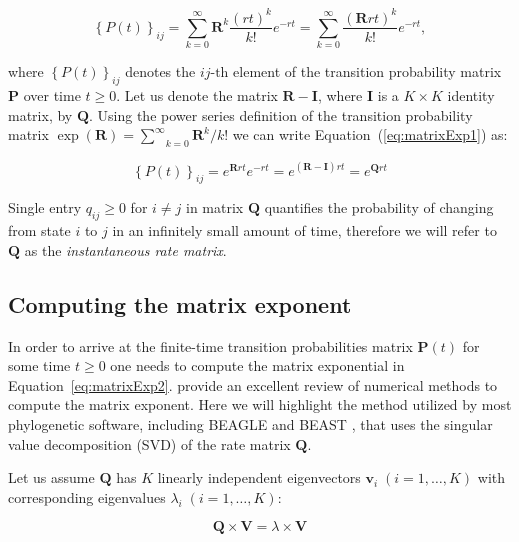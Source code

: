\begin{equation}
\left\{ P(t)\right\} _{ij}=\underset{k=0}{\overset{\infty}{\sum}}\mathbf{R}^{k}\frac{(r t)^{k}}{k!}e^{-r t}=\underset{k=0}{\overset{\infty}{\sum}}\frac{(\mathbf{R}r t)^{k}}{k!}e^{-r t},
\label{eq:matrixExp1}
\end{equation}

\noindent
where $\left\{ P(t)\right\} _{ij}$ denotes the $ij\text{-th}$ element of the transition probability matrix $\mathbf{P}$ over time $t \geq 0$.
Let us denote the matrix $\mathbf{R}-\mathbf{I}$, where $\mathbf{I}$ is a $K \times K$ identity matrix, by $\mathbf{Q}$.
Using the power series definition of the transition probability matrix $\exp(\mathbf{R})=\underset{k=0}{\overset{\infty}{\sum}}\mathbf{R}^{k}/k!$ we can write Equation~(\ref{eq:matrixExp1}) as:

\begin{equation}
\left\{ P(t)\right\} _{ij}=e^{\mathbf{R}r t}e^{-r t} =e^{(\mathbf{R}-\mathbf{I})r t}=e^{\mathbf{Q}r t} 
\label{eq:matrixExp2}
\end{equation}

\noindent
Single entry $q_{ij} \ge 0$ for $i \neq j$ in matrix $\mathbf{Q}$ quantifies the probability of changing from state $i$ to $j$ in an infinitely small amount of time, therefore we will refer to $\mathbf{Q}$ as the \emph{instantaneous rate matrix}.

\subsection{Computing the matrix exponent \label{sub:exponentiation}}

In order to arrive at the finite-time transition probabilities matrix $\mathbf{P}(t)$ for some time $t\geq0$ one needs to compute the matrix exponential in Equation~\ref{eq:matrixExp2}.
\cite{Moler1978} provide an excellent review of numerical methods to compute the matrix exponent. 
Here we will highlight the method utilized by most phylogenetic software, including BEAGLE \citep{Ayres2012} and BEAST \citep{Drummond2012}, that uses the singular value decomposition (SVD) of the rate matrix $\mathbf{Q}$.   

Let us assume $\mathbf{Q}$ has $K$ linearly independent eigenvectors $\mathbf{v}_{i} \; (i=1,\ldots,K)$ with corresponding eigenvalues $\lambda_{i}\;(i=1,\ldots,K)$:

\begin{equation}
\mathbf{Q}\times\mathbf{V}=\lambda\times\mathbf{V}
\label{eq:eigenvaluesEigenvectors}
\end{equation}

